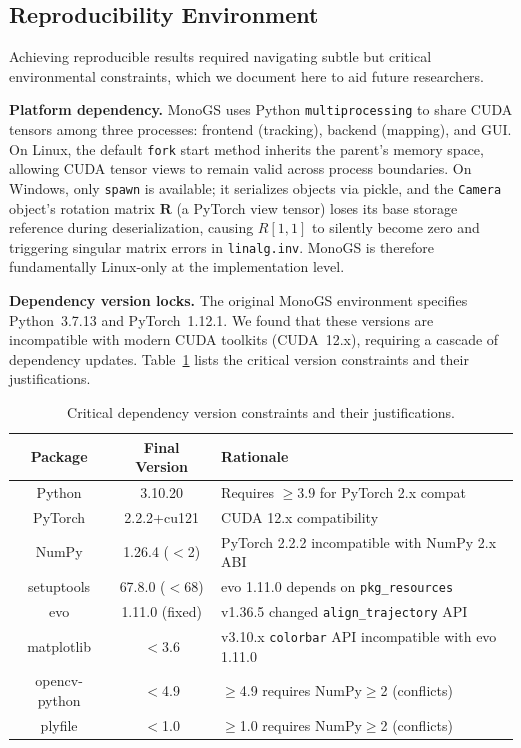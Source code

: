 \documentclass[conference]{IEEEtran}
\begin{document}
\subsection{Reproducibility Environment}
\label{sec:repro_env}

Achieving reproducible results required navigating subtle but critical environmental constraints, which we document here to aid future researchers.

\textbf{Platform dependency.}
MonoGS uses Python \texttt{multiprocessing} to share CUDA tensors among three processes: frontend (tracking), backend (mapping), and GUI.
On Linux, the default \texttt{fork} start method inherits the parent's memory space, allowing CUDA tensor views to remain valid across process boundaries.
On Windows, only \texttt{spawn} is available; it serializes objects via pickle, and the \texttt{Camera} object's rotation matrix $\mathbf{R}$ (a PyTorch view tensor) loses its base storage reference during deserialization, causing $R[1,1]$ to silently become zero and triggering singular matrix errors in \texttt{linalg.inv}.
MonoGS is therefore fundamentally Linux-only at the implementation level.

\textbf{Dependency version locks.}
The original MonoGS environment specifies Python~3.7.13 and PyTorch~1.12.1.
We found that these versions are incompatible with modern CUDA toolkits (CUDA~12.x), requiring a cascade of dependency updates.
Table~\ref{tab:deps} lists the critical version constraints and their justifications.

\begin{table}[htbp]
\caption{Critical dependency version constraints and their justifications.}
\label{tab:deps}
\begin{center}
\small
\setlength{\tabcolsep}{3pt}
\begin{tabular}{|c|c|>{\centering\arraybackslash}m{110pt}|}
\hline
\textbf{Package} & \textbf{Final Version} & \textbf{Rationale} \\
\hline
Python & 3.10.20 & Requires $\geq$3.9 for PyTorch 2.x compat \\
\hline
PyTorch & 2.2.2+cu121 & CUDA 12.x compatibility \\
\hline
NumPy & 1.26.4 ($<$2) & PyTorch 2.2.2 incompatible with NumPy 2.x ABI \\
\hline
setuptools & 67.8.0 ($<$68) & evo 1.11.0 depends on \texttt{pkg\_resources} \\
\hline
evo & 1.11.0 (fixed) & v1.36.5 changed \texttt{align\_trajectory} API \\
\hline
matplotlib & $<$3.6 & v3.10.x \texttt{colorbar} API incompatible with evo 1.11.0 \\
\hline
opencv-python & $<$4.9 & $\geq$4.9 requires NumPy$\geq$2 (conflicts) \\
\hline
plyfile & $<$1.0 & $\geq$1.0 requires NumPy$\geq$2 (conflicts) \\
\hline
\end{tabular}
\end{center}
\end{table}
\end{document}
